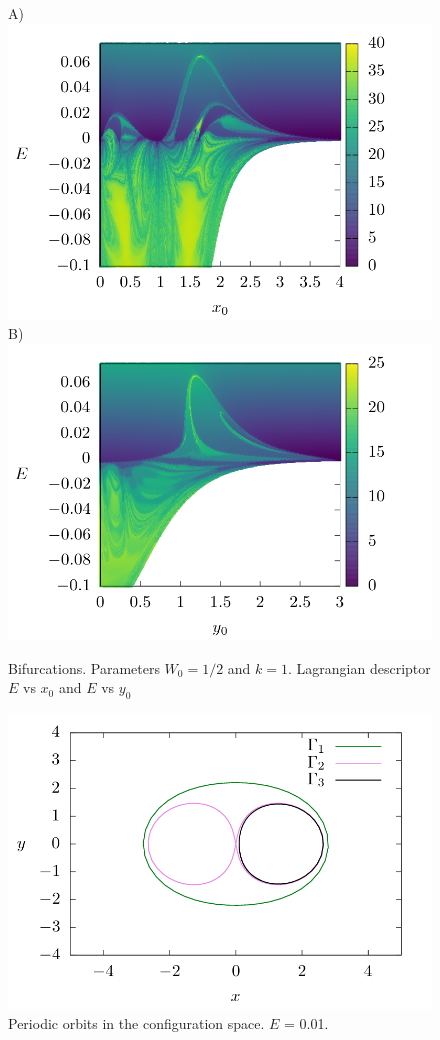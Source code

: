 \documentclass[10pt,aps,onecolumn,superscriptaddress]{revtex4-2}
\begin{document}
\begin{figure}[htbp]
	A)\includegraphics[scale=0.35]{ld_t60_line_x_E.png}
	B)\includegraphics[scale=0.35]{ld_t60_line_y_E.png}
	\caption{ Bifurcations.  Parameters $W_0 = 1/2$ and $k = 1$. Lagrangian descriptor $E$ vs $x_0$ and $E$ vs $y_0$ }
	\label{fig:ld_E_xy}
\end{figure}

\begin{figure}[htbp]
	\includegraphics[scale=0.5]{orbits_2D.png}
	\caption{Periodic orbits in the configuration space. $E$ = 0.01. }
	\label{fig:ld_E_xy}
\end{figure}
\end{document}
